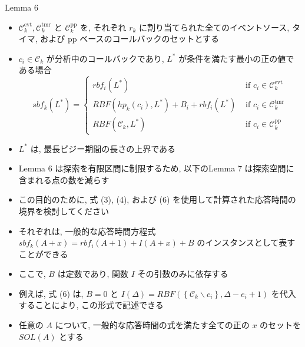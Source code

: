 \begin{frame}[label=lemma6]{Lemma 6}
    \begin{lemma}[]
        \begin{itemize}
            \item $\mathcal{C}_{k}^{\mathrm{evt}}, \mathcal{C}_{k}^{\mathrm{tmr}}$ と $\mathcal{C}_{k}^{\mathrm{pp}}$ を, それぞれ $r_{k}$ に割り当てられた全てのイベントソース, タイマ, および pp ベースのコールバックのセットとする
\item $c_{i} \in \mathcal{C}_{k}$ が分析中のコールバックであり, $L^{*}$ が条件を満たす最小の正の値である場合
                  \begin{equation*}
                      s b f_{k}\left(L^{*}\right)= \begin{cases}r b f_{i}\left(L^{*}\right) & \text { if } c_{i} \in \mathcal{C}_{k}^{\mathrm{evt}} \\ R B F\left(h p_{k}\left(c_{i}\right), L^{*}\right)+B_{i}+r b f_{i}\left(L^{*}\right) & \text { if } c_{i} \in \mathcal{C}_{k}^{\mathrm{tmr}} \\ R B F\left(\mathcal{C}_{k}, L^{*}\right) & \text { if } c_{i} \in \mathcal{C}_{k}^{\mathrm{pp}}\end{cases}
                  \end{equation*}

            \item $L^{*}$ は, 最長ビジー期間の長さの上界である
        \end{itemize}
    \end{lemma}
\end{frame}

\begin{frame}{}
    \begin{itemize}
        \item Lemma 6 は探索を有限区間に制限するため, 以下のLemma 7 は探索空間に含まれる点の数を減らす
\item この目的のために, 式 (3), (4), および (6) を使用して計算された応答時間の境界を検討してください
\item それぞれは, 一般的な応答時間方程式 $s b f_{k}(A+x)=r b f_{i}(A+1)+I(A+x)+B$ のインスタンスとして表すことができる
\item ここで, $B$ は定数であり, 関数 $I$ その引数のみに依存する
\item 例えば, 式 (6) は, $B=0$ と $I(\Delta)=R B F\left(\left\{\mathcal{C}_{k} \backslash c_{i}\right\}, \Delta-e_{i}+1\right)$ を代入することにより, この形式で記述できる
\item 任意の $A$ について, 一般的な応答時間の式を満たす全ての正の $x$ のセットを $S O L(A)$ とする
    \end{itemize}
\end{frame}

